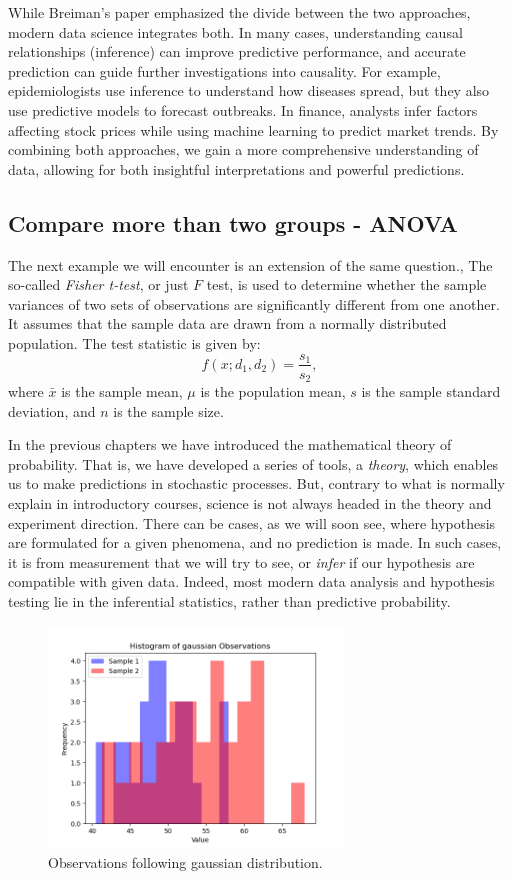 \documentclass{book}
\begin{document}
While Breiman’s paper emphasized the divide between the two approaches, modern data science integrates both. In many cases, understanding causal relationships (inference) can improve predictive performance, and accurate prediction can guide further investigations into causality. For example, epidemiologists use inference to understand how diseases spread, but they also use predictive models to forecast outbreaks. In finance, analysts infer factors affecting stock prices while using machine learning to predict market trends. By combining both approaches, we gain a more comprehensive understanding of data, allowing for both insightful interpretations and powerful predictions.

\newpage
\subsection{Compare more than two groups - ANOVA}

The next example we will encounter is an extension of the same question., The so-called \textit{Fisher t-test}, or just $F$ test, is used to determine whether the sample variances of two sets of observations are significantly different from one another. It assumes that the sample data are drawn from a normally distributed population. The test statistic is given by:
\[
    f(x; d_{1}, d_{2}) = \frac{s_1}{s_2},
\]
where $\bar{x}$ is the sample mean, $\mu$ is the population mean, $s$ is the sample standard deviation, and $n$ is the sample size.

In the previous chapters we have introduced the mathematical theory of probability. That is, we have developed a series of tools, a \textit{theory}, which enables us to make predictions in stochastic processes. But, contrary to what is normally explain in introductory courses, science is not always headed in the theory and experiment direction. There can be cases, as we will soon see, where hypothesis are formulated for a given phenomena, and no prediction is made. In such cases, it is from measurement that we will try to see, or \textit{infer} if our hypothesis are compatible with given data. Indeed, most modern data analysis and hypothesis testing lie in the inferential statistics, rather than predictive probability.

\begin{figure}[ht]
    \centering
    \includegraphics[width=0.7\textwidth]{figures/chapter4/f_observations.png}
    \caption{Observations following gaussian distribution.}
    \label{fig:f_obs}
\end{figure}
\end{document}
